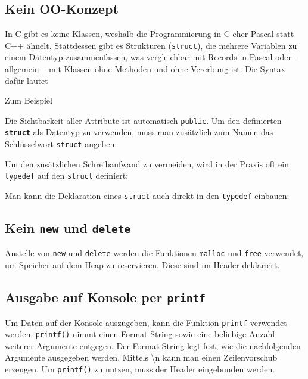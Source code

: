 \subsection{Kein OO-Konzept}
In C gibt es keine Klassen, weshalb die Programmierung in C eher Pascal statt C++ ähnelt.
Stattdessen gibt es Strukturen (\lstinline{struct}), die mehrere Variablen zu einem Datentyp zusammenfassen, was vergleichbar mit Records in Pascal oder -- allgemein -- mit Klassen ohne Methoden und ohne Vererbung ist.
%
Die Syntax dafür lautet
%

%
Zum Beispiel
%

%
Die Sichtbarkeit aller Attribute ist automatisch \lstinline{public}.
%
Um den definierten \textbf{\lstinline|struct|} als Datentyp zu verwenden, muss man zusätzlich zum Namen das Schlüsselwort \lstinline{struct} angeben:
%

%
Um den zusätzlichen Schreibaufwand zu vermeiden, wird in der Praxis oft ein \lstinline{typedef} auf den \lstinline{struct} definiert:
%

%
Man kann die Deklaration eines \lstinline{struct} auch direkt in den \lstinline{typedef} einbauen:
%


\subsection{Kein \lstinline{new} und \lstinline{delete}}

Anstelle von \lstinline{new} und \lstinline{delete} werden die Funktionen \lstinline{malloc} und \lstinline{free} verwendet, um Speicher auf dem Heap zu reservieren.
Diese sind im Header  deklariert.



\subsection{Ausgabe auf Konsole per \lstinline{printf}}

Um Daten auf der Konsole auszugeben, kann die Funktion \lstinline{printf} verwendet werden.
\lstinline{printf()} nimmt einen Format-String sowie eine beliebige Anzahl weiterer Argumente entgegen.
Der Format-String legt fest, wie die nachfolgenden Argumente ausgegeben werden.
Mittels \textbackslash n kann man einen Zeilenvorschub erzeugen. Um \lstinline{printf()} zu nutzen, muss der Header  eingebunden werden.

